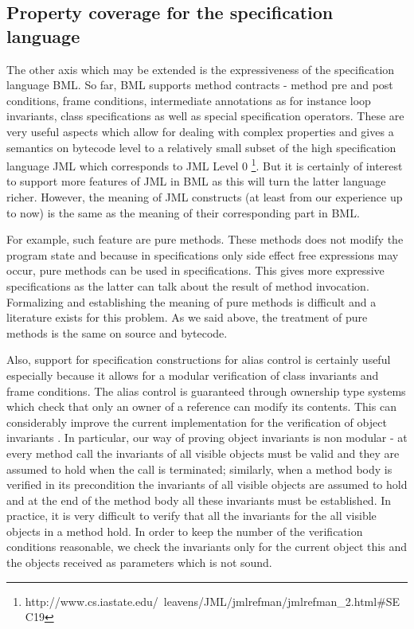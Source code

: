 \subsection{Property coverage for the specification language}
The other axis which may be extended is the expressiveness of the specification language BML. 
So far, BML supports method contracts - method pre and post  conditions, frame conditions, intermediate annotations as for instance
loop invariants, class specifications as well as special specification operators.
These are very useful aspects which allow for dealing with complex properties and 
gives a semantics on bytecode level  to a relatively small subset of the 
high specification language JML which corresponds to JML Level 0 \footnote{ http://www.cs.iastate.edu/~leavens/JML/jmlrefman/jmlrefman\_2.html\#SEC19}. 
 But it is certainly of interest to support more features of JML in BML
as this will turn the latter language richer. However, the meaning  of JML constructs 
(at least from our experience up to  now) is the same as the meaning of their corresponding part in BML.  

For example, such feature are  pure methods. These methods does not modify the program state and because in specifications only side effect free 
expressions may occur, pure methods can be used in specifications.
 This gives more expressive  specifications as the latter can talk about the result of method invocation. 
Formalizing and establishing the meaning of pure methods is difficult and a literature exists for this problem.
 As we said above, the treatment of pure methods is the same on source and bytecode.



Also, support for specification constructions for alias control is certainly useful especially because it allows for a modular verification 
of class invariants and frame conditions.
The alias control is guaranteed through ownership type systems which check that only an owner of a reference can modify its contents.
 This can considerably improve the current implementation for the verification of object invariants  \cite{DietlMueller05}.
In particular, our way of proving object invariants is non modular - at every method call the invariants of all visible 
objects must be valid and they are assumed to hold when the call is terminated; similarly, when a method body is verified in its precondition the invariants of all visible
objects are assumed to hold and at the end of the method body all these invariants must be established. 
In practice, it is very difficult to verify that all the invariants for the all visible objects in a method  hold.
In order to keep the number of the verification conditions reasonable, we check the invariants only for the current object this and the 
objects received as parameters which is not sound.

